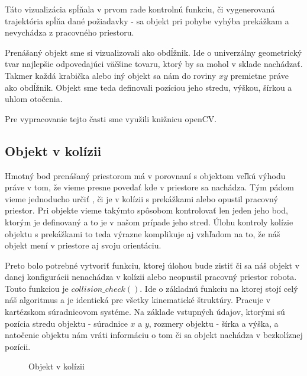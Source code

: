 Táto vizualizácia spĺňala v prvom rade kontrolnú funkciu, či vygenerovaná trajektória spĺňa dané požiadavky - sa objekt pri pohybe vyhýba prekážkam a nevychádza z pracovného priestoru.

Prenášaný objekt sme si vizualizovali ako obdĺžnik. Ide o univerzálny geometrický tvar najlepšie odpovedajúci  väčšine tovaru, ktorý by sa mohol v sklade nachádzať. Takmer každá krabička alebo iný objekt sa nám do roviny $ xy $ premietne práve ako obdĺžnik. Objekt sme teda definovali pozíciou jeho stredu, výškou, šírkou a uhlom otočenia. 

Pre vypracovanie tejto časti sme využili knižnicu openCV.

\subsection{Objekt v kolízii}
Hmotný bod prenášaný priestorom má v porovnaní s objektom veľkú výhodu práve v tom, že vieme presne povedať kde v priestore sa nachádza. Tým pádom vieme jednoducho určiť , či je v kolízii s prekážkami alebo opustil pracovný priestor. Pri objekte vieme takýmto spôsobom kontrolovať len jeden jeho bod, ktorým je definovaný a to je v našom prípade jeho stred. Úlohu kontroly kolízie objektu s prekážkami to teda výrazne komplikuje aj vzhľadom na to, že náš objekt mení v priestore aj svoju orientáciu. 

Preto bolo potrebné vytvoriť funkciu, ktorej úlohou bude zistiť či sa náš objekt v danej konfigurácii nenachádza v kolízii alebo neopustil pracovný priestor robota. Touto funkciou je $ collision\_check() $. Ide o základnú funkciu na ktorej stojí celý náš algoritmus a je identická pre všetky kinematické štruktúry. Pracuje v kartézskom súradnicovom systéme. Na základe vstupných údajov, ktorými sú pozícia stredu objektu - súradnice $ x $ a $ y $, rozmery objektu - šírka a výška, a natočenie objektu nám vráti informáciu o tom či sa objekt nachádza v bezkolíznej pozícii. 

\begin{figure}[h!]
	\centering
	\caption{Objekt v kolízii} \label{OBRAZOK 4.2} 
\end{figure} 

